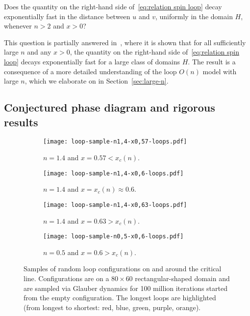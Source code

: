 \documentclass[12pt,reqno]{article}
\begin{document}
\medbreak
{}
\label{quest:loop-On-quest}
Does the quantity on the right-hand side of~\eqref{eq:relation spin loop} decay exponentially fast in the distance between $u$ and $v$, uniformly in the domain $H$, whenever $n>2$ and $x>0$?
\medbreak

This question is partially answered in~\cite{DCPSS14}, where it is shown that for all sufficiently
large $n$ and any $x>0$, the quantity on the right-hand side
of~\eqref{eq:relation spin loop} decays exponentially fast for a
large class of domains $H$. The result is a consequence of a more
detailed understanding of the loop $O(n)$
model with large $n$, which we elaborate on in Section~\ref{sec:large-n}.


\subsection{Conjectured phase diagram and rigorous results}\label{sec:loop_O_n_phase_diagram}

\begin{figure}[!ht]
	\centering
	\begin{subfigure}[t]{.49\textwidth}
		\texttt{[image: loop-sample-n1,4-x0,57-loops.pdf]}
		\caption{$n=1.4$ and $x=0.57<x_c(n)$.}
		\label{fig:loop-sample-n1.4-x0.57}
	\end{subfigure}%
	\begin{subfigure}{10pt}
		\quad
	\end{subfigure}%
	\begin{subfigure}[t]{.49\textwidth}
		\texttt{[image: loop-sample-n1,4-x0,6-loops.pdf]}
		\caption{$n=1.4$ and $x=x_c(n) \approx 0.6$.}
		\label{fig:loop-sample-n1.4-x0.6}
	\end{subfigure}
	\medbreak
	\begin{subfigure}[t]{.49\textwidth}
		\texttt{[image: loop-sample-n1,4-x0,63-loops.pdf]}
		\caption{$n=1.4$ and $x=0.63>x_c(n)$.}
		\label{fig:loop-sample-n1.4-x0.63}
	\end{subfigure}%
	\begin{subfigure}{10pt}
		\quad
	\end{subfigure}%
	\begin{subfigure}[t]{.49\textwidth}
		\texttt{[image: loop-sample-n0,5-x0,6-loops.pdf]}
		\caption{$n=0.5$ and $x=0.6>x_c(n)$.}
		\label{fig:loop-sample-n0.5-x0.6}
	\end{subfigure}
	\caption{Samples of random loop configurations on and around the critical line. Configurations are on a $80\times60$ rectangular-shaped domain and are sampled via Glauber dynamics for 100 million iterations started from the empty configuration. The longest loops are highlighted (from longest to shortest: red, blue, green, purple, orange).}
	\label{fig:loop-samples}
\end{figure}
\end{document}
